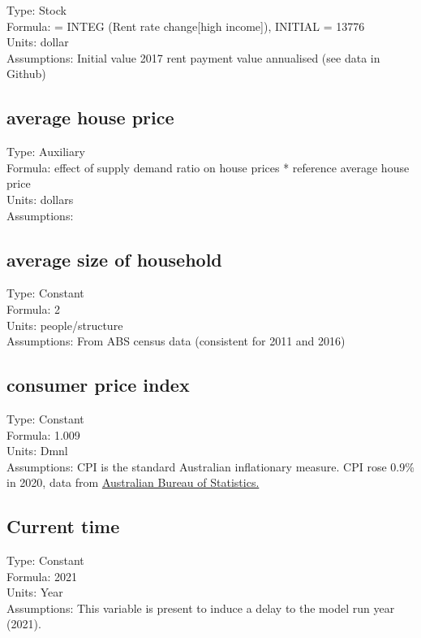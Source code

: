 \documentclass[
  11pt,
]{book}
\begin{document}
Type: Stock\\
Formula: = INTEG (Rent rate change{[}high income{]}), INITIAL = 13776\\
Units: dollar\\
Assumptions: Initial value 2017 rent payment value annualised (see data in Github)

\hypertarget{average-house-price}{%
\subsection{average house price}\label{average-house-price}}

Type: Auxiliary\\
Formula: effect of supply demand ratio on house prices * reference average house price\\
Units: dollars\\
Assumptions:

\hypertarget{average-size-of-household}{%
\subsection{average size of household}\label{average-size-of-household}}

Type: Constant\\
Formula: 2\\
Units: people/structure\\
Assumptions: From ABS census data (consistent for 2011 and 2016)

\hypertarget{consumer-price-index}{%
\subsection{consumer price index}\label{consumer-price-index}}

Type: Constant\\
Formula: 1.009\\
Units: Dmnl\\
Assumptions: CPI is the standard Australian inflationary measure. CPI rose 0.9\% in 2020, data from \href{https://www.abs.gov.au/statistics/economy/price-indexes-and-inflation/consumer-price-index-australia/latest-release\#data-download}{Australian Bureau of Statistics.}

\hypertarget{current-time}{%
\subsection{Current time}\label{current-time}}

Type: Constant\\
Formula: 2021\\
Units: Year\\
Assumptions: This variable is present to induce a delay to the model run year (2021).
\end{document}
